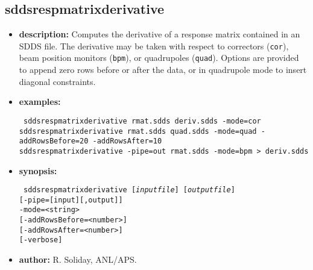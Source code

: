 %
\newpage
\subsection{sddsrespmatrixderivative}
\label{sddsrespmatrixderivative}

\begin{itemize}
\item {\bf description:} Computes the derivative of a response matrix contained in an SDDS file.  The derivative may be taken with respect to correctors ({\tt cor}), beam position monitors ({\tt bpm}), or quadrupoles ({\tt quad}).  Options are provided to append zero rows before or after the data, or in quadrupole mode to insert diagonal constraints.
\item {\bf examples:}
\begin{flushleft}{\tt
sddsrespmatrixderivative rmat.sdds deriv.sdds -mode=cor\\
sddsrespmatrixderivative rmat.sdds quad.sdds -mode=quad -addRowsBefore=20 -addRowsAfter=10\\
sddsrespmatrixderivative -pipe=out rmat.sdds -mode=bpm > deriv.sdds
}\end{flushleft}
\item {\bf synopsis:}
\begin{flushleft}{\tt
sddsrespmatrixderivative [{\em inputfile}] [{\em outputfile}]\\
{}[-pipe=[input][,output]]\\
                        -mode={<string>}\\
{}[-addRowsBefore={<number>}]\\
{}[-addRowsAfter={<number>}]\\
{}[-verbose]
}\end{flushleft}
\item {\bf author:} R. Soliday, ANL/APS.
\end{itemize}
